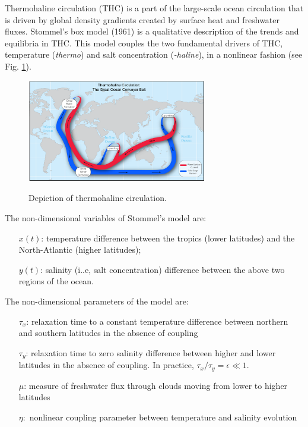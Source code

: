\begin{exercise}
Thermohaline circulation (THC) is a part of the large-scale ocean circulation that is driven by global density gradients created by surface heat and freshwater fluxes. Stommel's box model (1961) is a qualitative description of the trends and equilibria in THC. This model couples the two fundamental drivers of THC, temperature (\emph{thermo}) and salt concentration (\emph{-haline}), in a nonlinear fashion (see Fig. \ref{fig:ex96thermohaline}).

\begin{figure}[h]
	\centering
	\includegraphics[width=0.7\textwidth]{figures/ch9/Series/thermohaline.png}
	\label{fig:ex96thermohaline}
	\caption{Depiction of thermohaline circulation.}
\end{figure}

The non-dimensional variables of Stommel's model are:
\begin{enumerate}
\item [{$x(t)$:}] temperature difference between the tropics (lower latitudes)
and the North-Atlantic (higher latitudes);
\item [{$y(t)$:}] salinity (i..e, salt concentration) difference between
the above two regions of the ocean.
\end{enumerate}

The non-dimensional parameters of the model are:
\begin{enumerate}
\item [{$\tau_{x}$:}] relaxation time to a constant temperature difference
between northern and southern latitudes in the absence of coupling
\item [{$\tau_{y}$:}] relaxation time to zero salinity difference between
higher and lower latitudes in the absence of coupling. In practice,
$\tau_{x}/\tau_{y}=\epsilon\ll1.$
\item [{$\mu$:}] measure of freshwater flux through clouds moving from
lower to higher latitudes
\item [{$\eta:$}] nonlinear coupling parameter between temperature and
salinity evolution
\end{enumerate}


\end{exercise}
